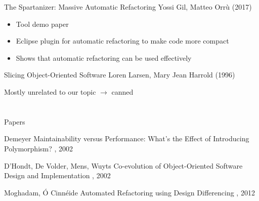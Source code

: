 \documentclass{beamer}
\begin{document}
\begin{frame}{The Spartanizer: Massive Automatic Refactoring}
  {Yossi Gil, Matteo Orrù (2017)}
  
  \begin{itemize}
    \item Tool demo paper
    \item Eclipse plugin for automatic refactoring to make code more compact
    \pause
    \item Shows that automatic refactoring can be used effectively
  \end{itemize}
\end{frame}

\begin{frame}{Slicing Object-Oriented Software}
  {Loren Larsen, Mary Jean Harrold (1996)}
  
  Mostly unrelated to our topic $\rightarrow$ canned
\end{frame}

%  
%


\appendix
\section*{\appendixname}

\begin{frame}{Papers}
  \begin{thebibliography}{10}
    \beamertemplatearticlebibitems
    
      Demeyer
      \newblock Maintainability versus Performance: What's the Effect of Introducing Polymorphism?
      , 2002
    
      D'Hondt, De Volder, Mens, Wuyts
      \newblock Co-evolution of Object-Oriented Software Design and Implementation
      , 2002
    
      Moghadam, Ó Cinnéide
      \newblock Automated Refactoring using Design Differencing
      , 2012
  \end{thebibliography}
\end{frame}
\end{document}
